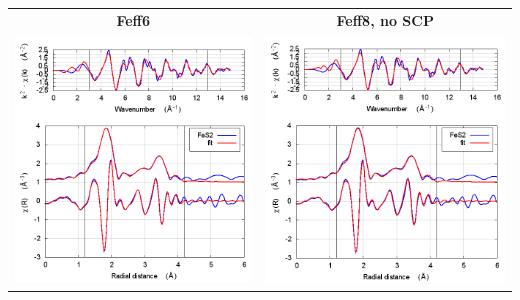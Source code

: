 \documentclass[11pt]{article}
\begin{document}
\begin{center}
  \begin{tabular}{cc}
    \textbf{Feff6} & \textbf{Feff8, no SCP} \\ 
    \includegraphics[width=.45\linewidth]{FeS2/scf/fit_feff6.png} & 
    \includegraphics[width=.45\linewidth]{FeS2/scf/fit_noSCF.png} \\
  \end{tabular}
\end{center}
\end{document}
